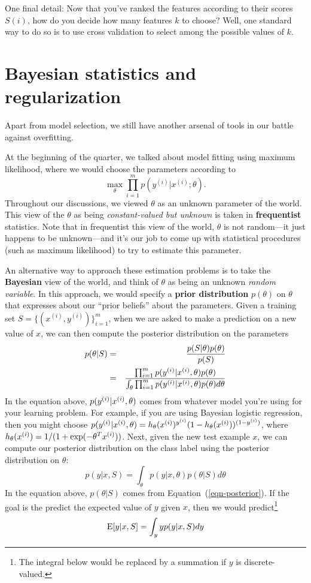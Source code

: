 \documentclass{article}
\begin{document}
One final detail: Now that you've ranked the features according to their scores $S(i)$,
how do you decide how many features $k$ to choose?  Well, one standard way to 
do so is to use cross validation to select among the possible values of $k$.  


\section{Bayesian statistics and regularization}

Apart from model selection, we still have another arsenal of tools in our battle
against overfitting. 

At the beginning of the quarter, we talked about model fitting using maximum likelihood, 
where we would choose the parameters according to 
\[
\max_\theta \prod_{i=1}^m p(y^{(i)} | x^{(i)};\theta).
\]
Throughout our discussions, we viewed $\theta$ as an unknown
parameter of the world.
This view of the $\theta$ as being \emph{constant-valued
but unknown} is taken in {\bf frequentist} statistics.  
Note that in frequentist this view of the world, $\theta$ is 
not random---it just happens to be unknown---and it's our job to come 
up with statistical procedures (such as maximum likelihood) to try to 
estimate this parameter.  

An alternative way to approach these estimation problems is to take the {\bf Bayesian}
view of the world, and think of $\theta$ as being an unknown \emph{random variable}.
In this approach, we would specify a {\bf prior distribution} $p(\theta)$ on $\theta$
that expresses about our ``prior beliefs'' about the parameters.  Given a training set 
$S = \{(x^{(i)}, y^{(i)})\}_{i=1}^m$, when we are asked to make a prediction on a 
new value of $x$, we can then compute the posterior distribution on the parameters
\begin{eqnarray}
p(\theta | S) &=& \frac{p(S|\theta) p(\theta)}{p(S)}  \nonumber \\
  &=& 
  \frac{\prod_{i=1}^m p({y^{(i)}} | {x^{(i)}}, \theta) p(\theta)}{\int_\theta \prod_{i=1}^m p({y^{(i)}} | {x^{(i)}}, \theta) p(\theta) d\theta} \label{eqn-posterior}
\end{eqnarray}
In the equation above, $p({y^{(i)}}|{x^{(i)}},\theta)$ comes from whatever model you're
using for your learning problem.  For example, if you are using Bayesian logistic
regression, then you might choose $p({y^{(i)}} | {x^{(i)}},\theta) = 
h_\theta({x^{(i)}})^{y^{(i)}}
(1-h_\theta({x^{(i)}}))^{(1-{y^{(i)}})}$, where 
$h_\theta({x^{(i)}}) = 1/(1+\exp(-\theta^T{x^{(i)}}))$.
Next, given the new test example $x$, we can compute our posterior 
distribution on the class label using the 
posterior distribution on $\theta$:
\begin{equation}
p(y|x, S) = \int_\theta p(y|x,\theta) p(\theta|S) d\theta  \label{eqn-avgy}
\end{equation}
In the equation above, $p(\theta|S)$ comes from Equation~(\ref{eqn-posterior}).  
If the goal is the predict the expected value of $y$ given $x$, then we would
predict\footnote{The integral below would be replaced by a summation if $y$ is discrete-valued.}
\[
{\rm E}[y|x,S] = \int_y y p(y|x, S) dy
\]
\end{document}
